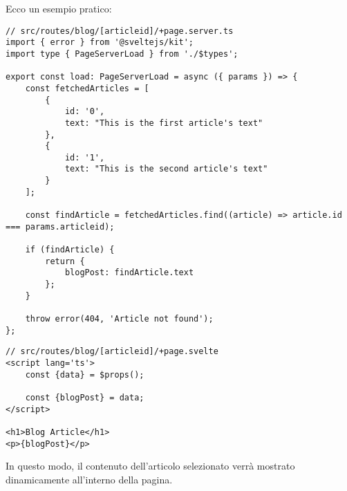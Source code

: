 \documentclass[12pt]{article}
\begin{document}
Ecco un esempio pratico:
\begin{verbatim}
// src/routes/blog/[articleid]/+page.server.ts
import { error } from '@sveltejs/kit';
import type { PageServerLoad } from './$types';

export const load: PageServerLoad = async ({ params }) => {
	const fetchedArticles = [
		{
			id: '0',
			text: "This is the first article's text"
		},
		{
			id: '1',
			text: "This is the second article's text"
		}
	];

	const findArticle = fetchedArticles.find((article) => article.id === params.articleid);

	if (findArticle) {
		return {
			blogPost: findArticle.text
		};
	}

	throw error(404, 'Article not found');
};
\end{verbatim}
\pagebreak
\begin{verbatim}
// src/routes/blog/[articleid]/+page.svelte
<script lang='ts'>
    const {data} = $props();

    const {blogPost} = data;
</script>

<h1>Blog Article</h1>
<p>{blogPost}</p>
\end{verbatim}
In questo modo, il contenuto dell'articolo selezionato
verrà mostrato dinamicamente all'interno della pagina.
\end{document}
